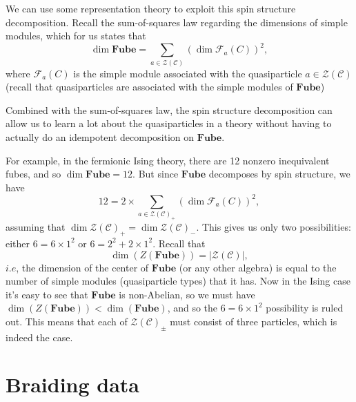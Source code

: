 \documentclass[12pt,a4paper]{article}
\newcommand\be            {\begin{equation}}
\newcommand\ee            {\end{equation}}
\newcommand{\zc}{\mathcal{Z}(\mathcal{C})}
\newcommand{\fube}{\textbf{Fube}}
\newcommand{\fld}{\mathcal{F}}
\begin{document}
We can use some representation theory to exploit this spin structure decomposition. Recall the sum-of-squares law regarding the dimensions of simple modules, which for us states that 
\be \dim \fube = \sum_{a\in \zc} (\dim \fld_a(C))^2,\ee
where $\fld_a(C)$ is the simple module associated with the quasiparticle $a \in \zc$ (recall that quasiparticles are associated with the simple modules of $\fube$)

 Combined with the sum-of-squares law, the spin structure decomposition can allow us to learn a lot about the quasiparticles in a theory without having to actually do an idempotent decomposition on $\fube$. 
 
 For example, in the fermionic Ising theory, there are 12 nonzero inequivalent fubes, and so $\dim \fube = 12$. But since $\fube$ decomposes by spin structure, we have 
 \be 12 = 2 \times \sum_{a\in \zc_+} (\dim \fld_a(C))^2,\ee
 assuming that $\dim \zc_+ = \dim\zc_-$. This gives us only two possibilities: either $6 = 6\times1^2$ or $6 = 2^2 + 2\times 1^2$. Recall that 
 \be \dim(Z(\fube)) = |\zc|,\ee
 $i.e$, the dimension of the center of $\fube$ (or any other algebra) is equal to the number of simple modules (quasiparticle types) that it has. Now in the Ising case it's easy to see that $\fube$ is non-Abelian, so we must have $\dim(Z(\fube)) < \dim(\fube)$, and so the $6 = 6\times1^2$ possibility is ruled out. This means that each of $\zc_\pm$ must consist of three particles, which is indeed the case. 

\section{Braiding data}
\end{document}
